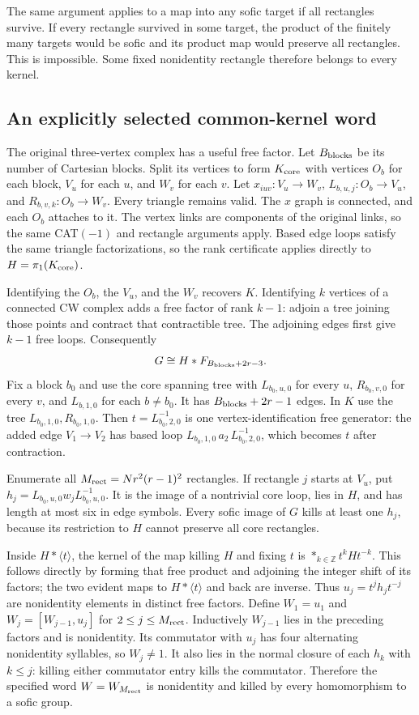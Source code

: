 \documentclass[11pt]{article}
\theoremstyle{definition}
\begin{document}
The same argument applies to a map into any sofic target if all
rectangles survive. If every rectangle survived in some target,
the product of the finitely many targets would be sofic and its
product map would preserve all rectangles. This is impossible.
Some fixed nonidentity rectangle therefore belongs to every kernel.

\subsection{An explicitly selected common-kernel word}
The original three-vertex complex has a useful free factor.
Let $B_{\rm blocks}$ be its number of Cartesian blocks.
Split its vertices to form $K_{\rm core}$ with vertices
$O_b$ for each block, $V_u$ for each $u$, and $W_v$ for each $v$.
Let $x_{iuv}:V_u\to W_v$,
$L_{b,u,j}:O_b\to V_u$, and $R_{b,v,k}:O_b\to W_v$.
Every triangle remains valid. The $x$ graph is connected, and each
$O_b$ attaches to it. The vertex links are components of the original
links, so the same CAT$(-1)$ and rectangle arguments apply.
Based edge loops satisfy the same triangle factorizations, so the
rank certificate applies directly to $H=\pi_1(K_{\rm core})$.

Identifying the $O_b$, the $V_u$, and the $W_v$ recovers $K$.
Identifying $k$ vertices of a connected CW complex adds a free factor
of rank $k-1$: adjoin a tree joining those points and contract that
contractible tree. The adjoining edges first give $k-1$ free loops.
Consequently
\[
 G\cong H*F_{B_{\rm blocks}+2r-3}.
\]
Fix a block $b_0$ and use the core spanning tree with
$L_{b_0,u,0}$ for every $u$, $R_{b_0,v,0}$ for every $v$,
and $L_{b,1,0}$ for each $b\ne b_0$.
It has $B_{\rm blocks}+2r-1$ edges.
In $K$ use the tree $L_{b_0,1,0},R_{b_0,1,0}$.
Then $t=L_{b_0,2,0}^{-1}$ is one vertex-identification free
generator: the added edge $V_1\to V_2$ has based loop
$L_{b_0,1,0}\,a_2\,L_{b_0,2,0}^{-1}$, which becomes $t$
after contraction.

Enumerate all $M_{\rm rect}=Nr^2(r-1)^2$ rectangles.
If rectangle $j$ starts at $V_u$, put
$h_j=L_{b_0,u,0}w_jL_{b_0,u,0}^{-1}$.
It is the image of a nontrivial core loop, lies in $H$, and
has length at most six in edge symbols.
Every sofic image of $G$ kills at least one $h_j$, because its
restriction to $H$ cannot preserve all core rectangles.

Inside $H*\langle t\rangle$, the kernel of the map killing $H$
and fixing $t$ is
$*_{k\in\mathbb Z}t^kHt^{-k}$.
This follows directly by forming that free product and adjoining
the integer shift of its factors; the two evident maps to
$H*\langle t\rangle$ and back are inverse.
Thus $u_j=t^jh_jt^{-j}$ are nonidentity elements in distinct free
factors. Define
$W_1=u_1$ and $W_j=[W_{j-1},u_j]$ for $2\le j\le M_{\rm rect}$.
Inductively $W_{j-1}$ lies in the preceding factors and is nonidentity.
Its commutator with $u_j$ has four alternating nonidentity syllables,
so $W_j\ne1$. It also lies in the normal closure of each $h_k$ with
$k\le j$: killing either commutator entry kills the commutator.
Therefore the specified word $W=W_{M_{\rm rect}}$ is nonidentity
and killed by every homomorphism to a sofic group.
\end{document}
